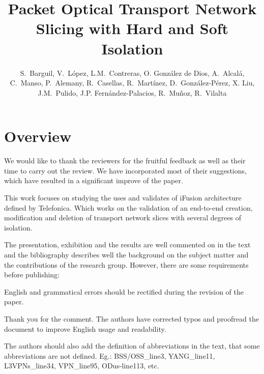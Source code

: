 \documentclass[12pt]{journalrebuttal}
\title{Packet Optical Transport Network Slicing with Hard and Soft Isolation}
\author{S.~Barguil, V.~López, L.M.~Contreras, O. González de Dios, A.~Alcalá, C.~Manso, P.~Alemany, R.~Casellas, R.~Martínez, D.~González-Pérez, X. Liu, J.M.~Pulido, J.P. Fernández-Palacios, R.~Muñoz, R.~Vilalta}
\begin{document}
\maketitle

\vspace{0.5cm}
\makerule
\section*{Overview}

We would like to thank the reviewers for the fruitful feedback as well as their time to carry out the review. We have incorporated most of their suggestions, which have resulted in a significant improve of the paper.

\nextreviewer

\begin{revcomment}
This work focuses on studying the uses and validates of iFusion architecture defined by Telefonica. Which works on the validation of an end-to-end creation, modification and deletion of transport network slices with several degrees of isolation. 

The presentation, exhibition and the results are well commented on in the text and the bibliography describes well the background on the subject matter and the contributions of the research group.  
However, there are some requirements before publishing:
\end{revcomment}

\begin{revcomment}
English and grammatical errors should be rectified during the revision of the paper.
\end{revcomment}

\begin{response}
Thank you for the comment.  The authors have corrected typos and proofread the document to improve English usage and readability.
\end{response}

\begin{revcomment}
The authors should also add the definition of abbreviations in the text, that some abbreviations are not defined. Eg.: BSS/OSS\_line3, YANG\_line11, L3VPNs\_line34, VPN\_line95, ODus-line113, etc.
\end{revcomment}
\end{document}
